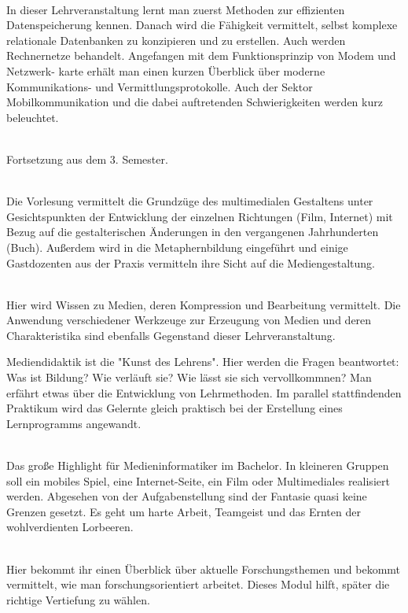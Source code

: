 \textbf{} \\
In dieser Lehrveranstaltung lernt man zuerst Methoden zur effizienten Datenspeicherung kennen.
Danach wird die Fähigkeit vermittelt, selbst komplexe relationale Datenbanken zu konzipieren und zu erstellen.
Auch werden Rechnernetze behandelt.
Angefangen mit dem Funktionsprinzip von Modem und Netzwerk- karte erhält man einen kurzen Überblick über moderne Kommunikations- und Vermittlungsprotokolle.
Auch der Sektor Mobilkommunikation und die dabei auftretenden Schwierigkeiten werden kurz beleuchtet.

\textbf{} \\
Fortsetzung aus dem 3. Semester.

\textbf{} \\
Die Vorlesung vermittelt die Grundzüge des multimedialen Gestaltens unter Gesichtspunkten der Entwicklung der einzelnen Richtungen (Film, Internet) mit Bezug auf die gestalterischen Änderungen in den vergangenen Jahrhunderten (Buch).
Außerdem wird in die Metaphernbildung eingeführt und einige Gastdozenten aus der Praxis vermitteln ihre Sicht auf die Mediengestaltung.

\textbf{} \\
Hier wird Wissen zu Medien, deren Kompression und Bearbeitung vermittelt.
Die Anwendung verschiedener Werkzeuge zur Erzeugung von Medien und deren Charakteristika sind ebenfalls Gegenstand dieser Lehrveranstaltung.

\textbf{}
Mediendidaktik ist die "Kunst des Lehrens".
Hier werden die Fragen beantwortet:
Was ist Bildung?
Wie verläuft sie?
Wie lässt sie sich vervollkommnen?
Man erfährt etwas über die Entwicklung von Lehrmethoden.
Im parallel stattfindenden Praktikum wird das Gelernte gleich praktisch bei der Erstellung eines Lernprogramms angewandt.

\textbf{} \\
Das große Highlight für Medieninformatiker im Bachelor.
In kleineren Gruppen soll ein mobiles Spiel, eine Internet-Seite, ein Film oder Multimediales realisiert werden.
Abgesehen von der Aufgabenstellung sind der Fantasie quasi keine Grenzen gesetzt.
Es geht um harte Arbeit, Teamgeist und das Ernten der wohlverdienten Lorbeeren.

\textbf{} \\
Hier bekommt ihr einen Überblick über aktuelle Forschungsthemen und bekommt vermittelt, wie man forschungsorientiert arbeitet.
Dieses Modul hilft, später die richtige Vertiefung zu wählen.

